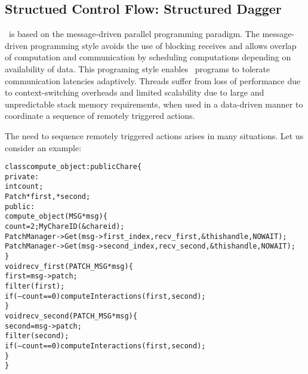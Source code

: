 \subsection{Structued Control Flow: Structured Dagger}
\label{sec:sdag}

\charmpp\ is based on the message-driven parallel programming paradigm.  The
message-driven programming style avoids the use of blocking receives and
allows overlap of computation and communication by scheduling computations
depending on availability of data.  This programing style enables \charmpp\
programs to tolerate communication latencies adaptively. Threads suffer from
loss of performance due to context-switching overheads and limited scalability
due to large and unpredictable stack memory requirements, when used in a
data-driven manner to coordinate a sequence of remotely triggered actions.

The need to sequence remotely triggered actions
arises in many situations. Let us consider an example:

\begin{center}
\begin{alltt}
      class compute_object : public Chare \{
      private:
      int         count;
      Patch       *first, *second;
      public:
      compute_object(MSG *msg) \{
      count = 2; MyChareID(\&chareid);
      PatchManager->Get(msg->first_index, recv_first, \&thishandle,NOWAIT);
      PatchManager->Get(msg->second_index, recv_second, \&thishandle,NOWAIT);
      \}
      void recv_first(PATCH_MSG *msg) \{
       first = msg->patch;
       filter(first);
       if (--count == 0 ) computeInteractions(first,second);
      \} 
      void recv_second(PATCH_MSG *msg)\{
       second = msg->patch;
       filter(second);
       if (--count == 0) computeInteractions(first,second);
      \}
     \}
\end{alltt}
\end{center}


